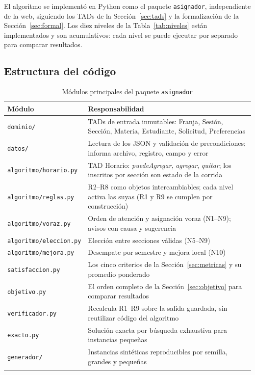
El algoritmo se implementó en Python como el paquete \texttt{asignador}, independiente de la web, siguiendo los TADs de la Sección~\ref{sec:tads} y la formalización de la Sección~\ref{sec:formal}. Los diez niveles de la Tabla~\ref{tab:niveles} están implementados y son acumulativos: cada nivel se puede ejecutar por separado para comparar resultados.

\subsection{Estructura del código}

\begin{table}[htbp]
\caption{Módulos principales del paquete \texttt{asignador}}\label{tab:modulos}
\small
\begin{tabularx}{\textwidth}{@{}lL@{}}
\toprule
Módulo & Responsabilidad \\
\midrule
\texttt{dominio/} & TADs de entrada inmutables: Franja, Sesión, Sección, Materia, Estudiante, Solicitud, Preferencias \\
\texttt{datos/} & Lectura de los JSON y validación de precondiciones; informa archivo, registro, campo y error \\
\texttt{algoritmo/horario.py} & TAD Horario: \emph{puedeAgregar}, \emph{agregar}, \emph{quitar}; los inscritos por sección son estado de la corrida \\
\texttt{algoritmo/reglas.py} & R2--R8 como objetos intercambiables; cada nivel activa las suyas (R1 y R9 se cumplen por construcción) \\
\texttt{algoritmo/voraz.py} & Orden de atención y asignación voraz (N1--N9); avisos con causa y sugerencia \\
\texttt{algoritmo/eleccion.py} & Elección entre secciones válidas (N5--N9) \\
\texttt{algoritmo/mejora.py} & Desempate por semestre y mejora local (N10) \\
\texttt{satisfaccion.py} & Los cinco criterios de la Sección~\ref{sec:metricas} y su promedio ponderado \\
\texttt{objetivo.py} & El orden completo de la Sección~\ref{sec:objetivo} para comparar resultados \\
\texttt{verificador.py} & Recalcula R1--R9 sobre la salida guardada, sin reutilizar código del algoritmo \\
\texttt{exacto.py} & Solución exacta por búsqueda exhaustiva para instancias pequeñas \\
\texttt{generador/} & Instancias sintéticas reproducibles por semilla, grandes y pequeñas \\
\botrule
\end{tabularx}
\end{table}

